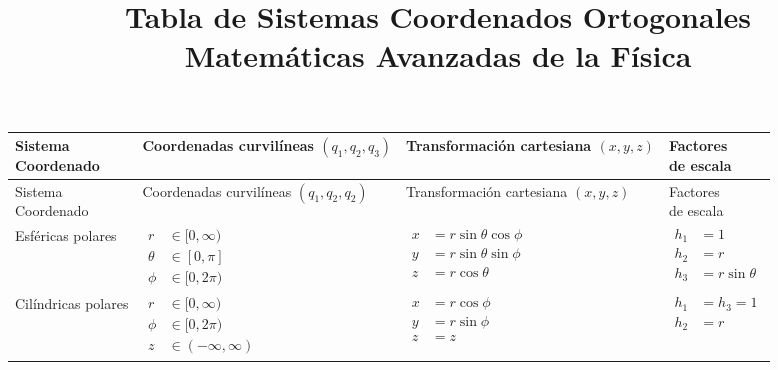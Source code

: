 \documentclass[12pt,landscape]{article}
\title{Tabla de Sistemas Coordenados Ortogonales \\ {\large Matemáticas Avanzadas de la Física}}
\date{ }
\author{}
\numberwithin{equation}{section}
\begin{document}
\renewcommand\labelenumii{\theenumi.{\arabic{enumii}}}
\maketitle
\fontsize{14}{14}\selectfont
\vspace{-2cm}
{\renewcommand{\arraystretch}{4}%
\begin{longtable}{| l | p{5cm} | l | p{7.3cm} |}
\hline

\makecell{Sistema \\ Coordenado} & \makecell{Coordenadas \\ curvilíneas \\ $(q_{1}, q_{2}, q_{3})$} & \makecell{Transformación cartesiana \\ $(x, y,z)$} & \makecell{Factores \\ de escala} \\ \hline
\endfirsthead

\hline
\makecell{Sistema \\ Coordenado} & \makecell{Coordenadas \\ curvilíneas \\ $(q_{1}, q_{2}, q_{2})$} & \makecell{Transformación cartesiana \\ $(x, y,z)$} & \makecell{Factores \\ de escala} \\ \hline
\endhead

Esféricas polares & 
$\!\begin{aligned}
r &\in [0, \infty) \\
\theta &\in [0, \pi] \\
\phi &\in [0, 2\pi)
\end{aligned}$ & $\!\begin{aligned} 
x &= r \sin \theta \cos \phi \\ 
y &= r \sin \theta \sin \phi \\
z &= r \cos \theta
\end{aligned}$ & 
$\!\begin{aligned} %
h_{1} &= 1 \\
h_{2} &= r \\
h_{3} &= r \sin \theta
\end{aligned}$ \\ \hline

Cilíndricas polares & $\!\begin{aligned}
r &\in[0,\infty) \\
\phi &\in [0,2\pi) \\
z &\in (-\infty,\infty) 
\end{aligned}$ &
$\!\begin{aligned}
x &= r \cos \phi \\
y &= r \sin \phi \\
z &= z
\end{aligned}$ &
$\!\begin{aligned}
h_{1 }&= h_{3} = 1 \\
h_{2} &= r
\end{aligned}$ \\ \hline


\end{longtable}}
\end{document}
